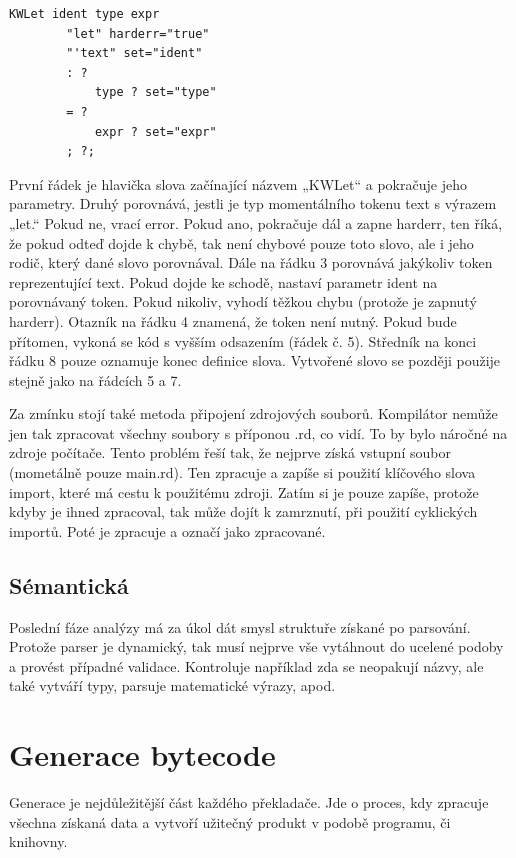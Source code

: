 \documentclass[12pt, a4paper,
twoside,        %
openright
]{report}
\begin{document}
	\begin{lstlisting}[caption={Ukázka klíčového slova let}]
	KWLet ident type expr
		"let" harderr="true"
		"'text" set="ident"
		: ?
			type ? set="type"
		= ?
			expr ? set="expr"
		; ?;
	\end{lstlisting}
	
	První řádek je hlavička slova začínající názvem „KWLet“ a pokračuje jeho parametry. Druhý porovnává, jestli je typ momentálního tokenu text s výrazem „let.“ Pokud ne, vrací error. Pokud ano, pokračuje dál a zapne harderr, ten říká, že pokud odteď dojde k chybě, tak není chybové pouze toto slovo, ale i jeho rodič, který dané slovo porovnával. Dále na řádku 3 porovnává jakýkoliv token reprezentující text. Pokud dojde ke schodě, nastaví parametr ident na porovnávaný token. Pokud nikoliv, vyhodí těžkou chybu (protože je zapnutý harderr). Otazník na řádku 4 znamená, že token není nutný. Pokud bude přítomen, vykoná se kód s vyšším odsazením (řádek č. 5). Středník na konci řádku 8 pouze oznamuje konec definice slova. Vytvořené slovo se později použije stejně jako na řádcích 5 a 7.
	
	Za zmínku stojí také metoda připojení zdrojových souborů. Kompilátor nemůže jen tak zpracovat všechny soubory s příponou .rd, co vidí. To by bylo náročné na zdroje počítače. Tento problém řeší tak, že nejprve získá vstupní soubor (mometálně pouze main.rd). Ten zpracuje a zapíše si použití klíčového slova import, které má cestu k použitému zdroji. Zatím si je pouze zapíše, protože kdyby je ihned zpracoval, tak může dojít k zamrznutí, při použití cyklických importů. Poté je zpracuje a označí jako zpracované.
	
	\clearpage
	
	
	\subsection{Sémantická}
	
	Poslední fáze analýzy má za úkol dát smysl struktuře získané po parsování. Protože parser je dynamický, tak musí nejprve vše vytáhnout do ucelené podoby a provést případné validace. Kontroluje například zda se neopakují názvy, ale také vytváří typy, parsuje matematické výrazy, apod.
	
	
	\section{Generace bytecode}
	
	Generace je nejdůležitější část každého překladače. Jde o proces, kdy zpracuje všechna získaná data a vytvoří užitečný produkt v podobě programu, či knihovny.
	
\end{document}
